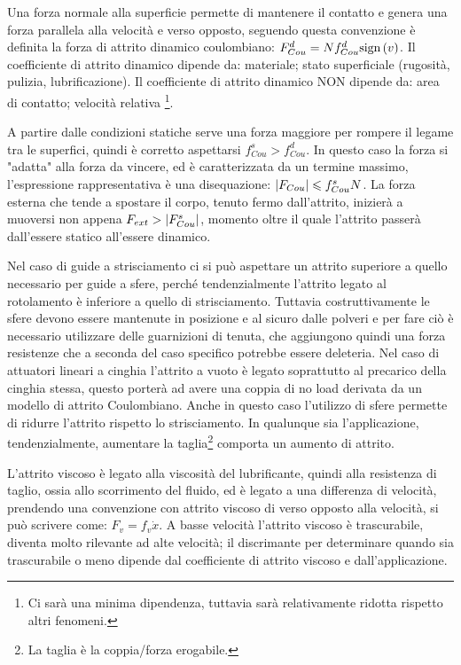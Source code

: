 Una forza normale alla superficie permette di mantenere il contatto e genera una forza parallela alla velocità e verso opposto, seguendo questa convenzione è definita la forza di attrito dinamico coulombiano: $F_{Cou}^d = N f_{Cou}^d \textup{sign}\left(v\right)$.
Il coefficiente di attrito dinamico dipende da: materiale; stato superficiale (rugosità, pulizia, lubrificazione).
Il coefficiente di attrito dinamico NON dipende da: area di contatto; velocità relativa \footnote{Ci sarà una minima dipendenza, tuttavia sarà relativamente ridotta rispetto altri fenomeni.}.

A partire dalle condizioni statiche serve una forza maggiore per rompere il legame tra le superfici, quindi è corretto aspettarsi $f_{Cou}^s>f_{Cou}^d$. In questo caso la forza si "adatta" alla forza da vincere, ed è caratterizzata da un termine massimo, l'espressione rappresentativa è una disequazione: $\left|F_{Cou}\right| \leqslant f_{Cou}^s N$.
La forza esterna che tende a spostare il corpo, tenuto fermo dall'attrito, inizierà a muoversi non appena $F_{ext}>\left|F_{Cou}^s\right|$, momento oltre il quale l'attrito passerà dall'essere statico all'essere dinamico.

Nel caso di guide a strisciamento ci si può aspettare un attrito superiore a quello necessario per guide a sfere, perché tendenzialmente l'attrito legato al rotolamento è inferiore a quello di strisciamento.
Tuttavia costruttivamente le sfere devono essere mantenute in posizione e al sicuro dalle polveri e per fare ciò è necessario utilizzare delle guarnizioni di tenuta, che aggiungono quindi una forza resistenze che a seconda del caso specifico potrebbe essere deleteria.
Nel caso di attuatori lineari a cinghia l'attrito a vuoto è legato soprattutto al precarico della cinghia stessa, questo porterà ad avere una coppia di no load derivata da un modello di attrito Coulombiano. Anche in questo caso l'utilizzo di sfere permette di ridurre l'attrito rispetto lo strisciamento.
In qualunque sia l'applicazione, tendenzialmente, aumentare la taglia\footnote{La taglia è la coppia/forza erogabile.} comporta un aumento di attrito.

L'attrito viscoso è legato alla viscosità del lubrificante, quindi alla resistenza di taglio, ossia allo scorrimento del fluido, ed è legato a una differenza di velocità, prendendo una convenzione con attrito viscoso di verso opposto alla velocità, si può scrivere come: $F_v=f_v \dot{x}$.
A basse velocità l'attrito viscoso è trascurabile, diventa molto rilevante ad alte velocità; il discrimante per determinare quando sia trascurabile o meno dipende dal coefficiente di attrito viscoso e dall'applicazione.

